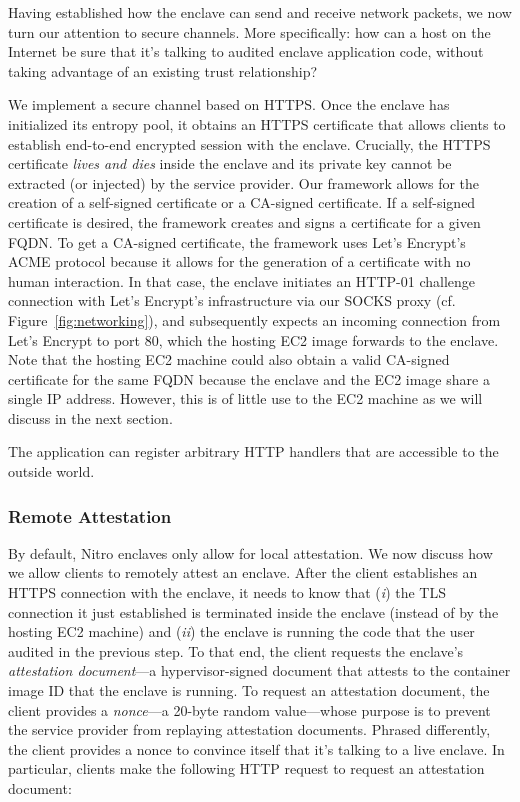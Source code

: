 Having established how the enclave can send and receive network packets, we now
turn our attention to secure channels.  More specifically: how can a host on
the Internet be sure that it's talking to audited enclave application code,
without taking advantage of an existing trust relationship?

We implement a secure channel based on HTTPS.  Once the enclave has initialized its
entropy pool, it obtains an HTTPS certificate that allows clients to establish
end-to-end encrypted session with the enclave.  Crucially, the HTTPS
certificate \emph{lives and dies} inside the enclave and its private key cannot
be extracted (or injected) by the service provider.  Our framework allows for
the creation of a self-signed certificate or a CA-signed certificate.  If a
self-signed certificate is desired, the framework creates and signs a
certificate for a given FQDN.  To get a CA-signed certificate, the framework
uses Let's Encrypt's ACME protocol because it allows for the generation of a
certificate with no human interaction.  In that case, the enclave initiates an
HTTP-01 challenge connection with Let's Encrypt's infrastructure via our SOCKS
proxy (cf. Figure~\ref{fig:networking}), and subsequently expects an incoming
connection from Let's Encrypt to port 80, which the hosting EC2 image forwards
to the enclave.  Note that the hosting EC2 machine could also obtain a valid
CA-signed certificate for the same FQDN because the enclave and the EC2 image
share a single IP address.  However, this is of little use to the EC2 machine
as we will discuss in the next section.

The application can register arbitrary HTTP handlers that are accessible to the
outside world.


\subsubsection{Remote Attestation}
\label{sec:attestation}

By default, Nitro enclaves only allow for local attestation.  We now discuss how
we allow clients to remotely attest an enclave.  After the client establishes an
HTTPS connection with the enclave, it needs to know that (\emph{i}) the TLS
connection it just established is terminated inside the enclave (instead of by
the hosting EC2 machine) and (\emph{ii}) the enclave is running the code that the user
audited in the previous step.  To that end, the client requests the enclave's
\emph{attestation document}---a hypervisor-signed document that attests to the
container image ID that the enclave is running.  To request an attestation
document, the client provides a \emph{nonce}---a 20-byte random value---whose
purpose is to prevent the service provider from replaying attestation documents.
Phrased differently, the client provides a nonce to convince itself that it's
talking to a live enclave.  In particular, clients make the following HTTP
request to request an attestation document:

